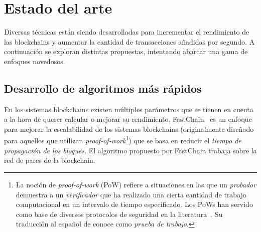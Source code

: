 

%

\section{Estado del arte}
Diversas técnicas están siendo desarrolladas para incrementar el rendimiento de las blockchains y
aumentar la cantidad de transacciones añadidas por segundo.
%
A continuación se exploran distintas propuestas, intentando abarcar una gama de enfoques novedosos.

\subsection{Desarrollo de algoritmos más rápidos}

En los sistemas blockchains existen múltiples parámetros que se tienen en cuenta
a la hora de querer calcular o mejorar su rendimiento.
%
FastChain~\cite{fastchain} es un enfoque para mejorar la escalabilidad de los sistemas blockchains
(originalmente diseñado para aquellos que utilizan \emph{proof-of-work}\footnote{La noción de
\emph{proof-of-work} (PoW) refiere a situaciones en las que un \emph{probador} demuestra a un \emph{verificador}
que ha realizado una cierta cantidad de trabajo computacional en un intervalo de tiempo especificado.
Los PoWs han servido como base de diversos protocolos de seguridad en la literatura~\cite{Jakobsson1999ProofsOW}.
Su traducción al español de conoce como \emph{prueba de trabajo}.})
que se basa en reducir el \emph{tiempo de propagación de los bloques}.
%
El algoritmo propuesto por FastChain trabaja sobre la red de pares de la blockchain.

